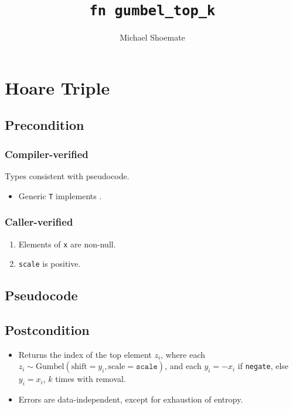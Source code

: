 \documentclass{article}
\title{\texttt{fn gumbel\_top\_k}}
\author{Michael Shoemate}
\begin{document}
\maketitle

\section{Hoare Triple}
\subsection*{Precondition}
\subsubsection*{Compiler-verified}
Types consistent with pseudocode.

\begin{itemize}
    \item Generic \texttt{T} implements .
\end{itemize}

\subsubsection*{Caller-verified}
\begin{enumerate}
    \item Elements of \texttt{x} are non-null.
    \item \texttt{scale} is positive.
\end{enumerate}

\subsection*{Pseudocode}
\label{sec:python-pseudocode}


\subsection*{Postcondition}

\begin{theorem}
    \label{postcondition}
    \begin{itemize}
        \item Returns the index of the top element $z_i$,
        where each $z_i \sim \mathrm{Gumbel}(\mathrm{shift}=y_i, \mathrm{scale}=\texttt{scale})$,
        and each $y_i = -x_i$ if \texttt{negate}, else $y_i = x_i$,
        $k$ times with removal.
        \item Errors are data-independent, except for exhaustion of entropy.
    \end{itemize}
\end{theorem}
\end{document}
